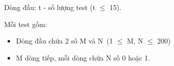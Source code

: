 Dòng đầu: t - số lượng test (t  $\le$  15).

Mỗi test gồm:
\begin{itemize}
	\item Dòng đầu chứa 2 số M và N (1  $\le$  M, N  $\le$  200)
	\item M dòng tiếp, mỗi dòng chứa N số 0 hoặc 1.
\end{itemize}

\